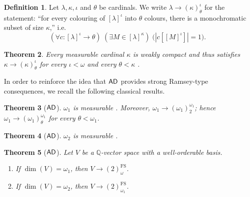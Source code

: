 \documentclass[10pt,a4paper]{amsart}
\newtheorem{theorem}{Theorem}[section]
\theoremstyle{definition}
\newtheorem{definition}[theorem]{Definition}
\newcommand{\ad}{\mathnormal{\mathsf{AD}}}
\theoremstyle{remark}
\numberwithin{equation}{section}
\begin{document}
\begin{definition}\label{def:partition-relation}
Let $\lambda,\kappa,\iota$ and $\theta$ be cardinals. We write $\lambda\to(\kappa)^{\iota}_{\theta}$ for the statement:
``for every colouring of $[\lambda]^{\iota}$ into $\theta$ colours, there is a monochromatic subset of size $\kappa$,'' i.e.
\[
(\forall c:[\lambda]^{\iota}\to\theta)\;
(\exists M\in[\lambda]^{\kappa})\;
\bigl(|c[[M]^{\iota}]|=1\bigr).
\]
\end{definition}

\begin{theorem}\label{thm:measurable-partition}
Every measurable cardinal $\kappa$ is weakly compact \cite[Lemma 10.18]{Jech2003} and thus satisfies $\kappa\to(\kappa)^{\iota}_{\theta}$ for every $\iota<\omega$ and every $\theta<\kappa$ \cite[Theorem 7.8]{Kanamori2003}.
\end{theorem}

In order to reinforce the idea that $\ad$ provides strong Ramsey-type consequences, we recall the following classical results.

\begin{theorem}[$\ad$]\label{thm:martin-omega1}
    $\omega_1$ is measurable \cite[Theorem 28.2 by D. Martin]{Kanamori2003}. Moreover, $\omega_1\to(\omega_1)^{\omega_1}_{2}$; hence $\omega_1\to(\omega_1)^{\omega_1}_{\theta}$ for every $\theta<\omega_1$.
\end{theorem}

\begin{theorem}[$\ad$]\label{thm:solovay-omega2}
    $\omega_2$ is measurable \cite[Theorem 28.6 by R. Solovay]{Kanamori2003}.
\end{theorem}

\begin{theorem}[$\ad$]\label{thm:hindman-omega1-positive}
Let $V$ be a $\mathbb{Q}$-vector space with a well-orderable basis.
\begin{enumerate}
    \item If $\operatorname{dim}(V)=\omega_1$, then $V\to(2)^{\operatorname{FS}}_{\omega}$.
    \item If $\operatorname{dim}(V)=\omega_2$, then $V\to(2)^{\operatorname{FS}}_{\omega_1}$.
\end{enumerate}
\end{theorem}
\end{document}
